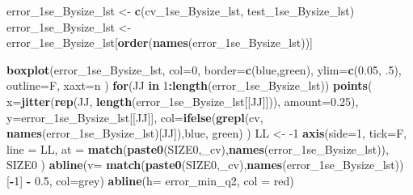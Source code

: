\documentclass[
]{book}
\newenvironment{Shaded}{\begin{snugshade}}{\end{snugshade}}
\newcommand{\ControlFlowTok}[1]{\textcolor[rgb]{0.13,0.29,0.53}{\textbf{#1}}}
\newcommand{\DataTypeTok}[1]{\textcolor[rgb]{0.13,0.29,0.53}{#1}}
\newcommand{\DecValTok}[1]{\textcolor[rgb]{0.00,0.00,0.81}{#1}}
\newcommand{\FloatTok}[1]{\textcolor[rgb]{0.00,0.00,0.81}{#1}}
\newcommand{\KeywordTok}[1]{\textcolor[rgb]{0.13,0.29,0.53}{\textbf{#1}}}
\newcommand{\NormalTok}[1]{#1}
\newcommand{\OperatorTok}[1]{\textcolor[rgb]{0.81,0.36,0.00}{\textbf{#1}}}
\newcommand{\StringTok}[1]{\textcolor[rgb]{0.31,0.60,0.02}{#1}}
\begin{document}
\begin{Shaded}
\begin{Highlighting}[]
\NormalTok{error\_1se\_Bysize\_lst <{-}}\StringTok{ }\KeywordTok{c}\NormalTok{(cv\_1se\_Bysize\_lst, test\_1se\_Bysize\_lst)}
\NormalTok{error\_1se\_Bysize\_lst <{-}}\StringTok{ }\NormalTok{error\_1se\_Bysize\_lst[}\KeywordTok{order}\NormalTok{(}\KeywordTok{names}\NormalTok{(error\_1se\_Bysize\_lst))]}

\KeywordTok{boxplot}\NormalTok{(error\_1se\_Bysize\_lst,}
  \DataTypeTok{col=}\DecValTok{0}\NormalTok{,}
  \DataTypeTok{border=}\KeywordTok{c}\NormalTok{(}\StringTok{\textquotesingle{}blue\textquotesingle{}}\NormalTok{,}\StringTok{\textquotesingle{}green\textquotesingle{}}\NormalTok{),}
  \DataTypeTok{ylim=}\KeywordTok{c}\NormalTok{(}\FloatTok{0.05}\NormalTok{, }\FloatTok{.5}\NormalTok{),}
  \DataTypeTok{outline=}\NormalTok{F,}
  \DataTypeTok{xaxt=}\StringTok{\textquotesingle{}n\textquotesingle{}}
\NormalTok{)}
\ControlFlowTok{for}\NormalTok{(JJ }\ControlFlowTok{in} \DecValTok{1}\OperatorTok{:}\KeywordTok{length}\NormalTok{(error\_1se\_Bysize\_lst))}
\KeywordTok{points}\NormalTok{(}
   \DataTypeTok{x=}\KeywordTok{jitter}\NormalTok{(}\KeywordTok{rep}\NormalTok{(JJ, }\KeywordTok{length}\NormalTok{(error\_1se\_Bysize\_lst[[JJ]])), }\DataTypeTok{amount=}\FloatTok{0.25}\NormalTok{), }
   \DataTypeTok{y=}\NormalTok{error\_1se\_Bysize\_lst[[JJ]],}
   \DataTypeTok{col=}\KeywordTok{ifelse}\NormalTok{(}\KeywordTok{grepl}\NormalTok{(}\StringTok{\textquotesingle{}cv\textquotesingle{}}\NormalTok{, }\KeywordTok{names}\NormalTok{(error\_1se\_Bysize\_lst)[JJ]),}\StringTok{\textquotesingle{}blue\textquotesingle{}}\NormalTok{, }\StringTok{\textquotesingle{}green\textquotesingle{}}\NormalTok{)}
\NormalTok{)}
\NormalTok{LL <{-}}\StringTok{ }\DecValTok{{-}1}
\KeywordTok{axis}\NormalTok{(}\DataTypeTok{side=}\DecValTok{1}\NormalTok{, }\DataTypeTok{tick=}\NormalTok{F, }\DataTypeTok{line =}\NormalTok{ LL,}
  \DataTypeTok{at =} \KeywordTok{match}\NormalTok{(}\KeywordTok{paste0}\NormalTok{(SIZE0,}\StringTok{\textquotesingle{}\_cv\textquotesingle{}}\NormalTok{),}\KeywordTok{names}\NormalTok{(error\_1se\_Bysize\_lst)),}
\NormalTok{  SIZE0}
\NormalTok{ )}
\KeywordTok{abline}\NormalTok{(}\DataTypeTok{v=} \KeywordTok{match}\NormalTok{(}\KeywordTok{paste0}\NormalTok{(SIZE0,}\StringTok{\textquotesingle{}\_cv\textquotesingle{}}\NormalTok{),}\KeywordTok{names}\NormalTok{(error\_1se\_Bysize\_lst))[}\OperatorTok{{-}}\DecValTok{1}\NormalTok{] }\OperatorTok{{-}}\StringTok{ }\FloatTok{0.5}\NormalTok{, }\DataTypeTok{col=}\StringTok{\textquotesingle{}grey\textquotesingle{}}\NormalTok{)}
\KeywordTok{abline}\NormalTok{(}\DataTypeTok{h=}\NormalTok{ error\_min\_q2, }\DataTypeTok{col =} \StringTok{\textquotesingle{}red\textquotesingle{}}\NormalTok{)}

\end{Highlighting}
\end{Shaded}
\end{document}
